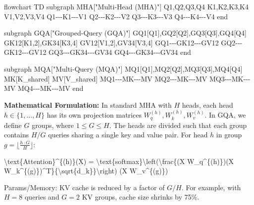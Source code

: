 \documentclass[
]{article}
\newenvironment{Shaded}{}{}
\newcommand{\NormalTok}[1]{#1}
\begin{document}
\begin{Shaded}
\begin{Highlighting}[]
\NormalTok{flowchart TD}
\NormalTok{    subgraph MHA["Multi{-}Head (MHA)"]}
\NormalTok{        Q1,Q2,Q3,Q4}
\NormalTok{        K1,K2,K3,K4}
\NormalTok{        V1,V2,V3,V4}
\NormalTok{        Q1{-}{-}{-}K1{-}{-}{-}V1}
\NormalTok{        Q2{-}{-}{-}K2{-}{-}{-}V2}
\NormalTok{        Q3{-}{-}{-}K3{-}{-}{-}V3}
\NormalTok{        Q4{-}{-}{-}K4{-}{-}{-}V4}
\NormalTok{    end}
    
\NormalTok{    subgraph GQA["Grouped{-}Query (GQA)"]}
\NormalTok{        GQ1[Q1],GQ2[Q2],GQ3[Q3],GQ4[Q4]}
\NormalTok{        GK12[K1,2],GK34[K3,4]}
\NormalTok{        GV12[V1,2],GV34[V3,4]}
\NormalTok{        GQ1{-}{-}{-}GK12{-}{-}{-}GV12}
\NormalTok{        GQ2{-}{-}{-}GK12{-}{-}{-}GV12}
\NormalTok{        GQ3{-}{-}{-}GK34{-}{-}{-}GV34}
\NormalTok{        GQ4{-}{-}{-}GK34{-}{-}{-}GV34}
\NormalTok{    end}
    
\NormalTok{    subgraph MQA["Multi{-}Query (MQA)"]}
\NormalTok{        MQ1[Q1],MQ2[Q2],MQ3[Q3],MQ4[Q4]}
\NormalTok{        MK[K\_shared]}
\NormalTok{        MV[V\_shared]}
\NormalTok{        MQ1{-}{-}{-}MK{-}{-}{-}MV}
\NormalTok{        MQ2{-}{-}{-}MK{-}{-}{-}MV}
\NormalTok{        MQ3{-}{-}{-}MK{-}{-}{-}MV}
\NormalTok{        MQ4{-}{-}{-}MK{-}{-}{-}MV}
\NormalTok{    end}
\end{Highlighting}
\end{Shaded}

\textbf{Mathematical Formulation:} In standard MHA with \(H\) heads,
each head \(h \in \{1, \dots, H\}\) has its own projection matrices
\(W_q^{(h)}, W_k^{(h)}, W_v^{(h)}\). In GQA, we define \(G\) groups,
where \(1 \le G \le H\). The heads are divided such that each group
contains \(H / G\) queries sharing a single key and value pair. For head
\(h\) in group \(g = \lfloor \frac{h \cdot G}{H} \rfloor\):

\begin{Shaded}
\begin{Highlighting}[]
\NormalTok{\textbackslash{}text\{Attention\}\^{}\{(h)\}(X) = \textbackslash{}text\{softmax\}\textbackslash{}left(\textbackslash{}frac\{(X W\_q\^{}\{(h)\})(X W\_k\^{}\{(g)\})\^{}T\}\{\textbackslash{}sqrt\{d\_k\}\}\textbackslash{}right) (X W\_v\^{}\{(g)\})}
\end{Highlighting}
\end{Shaded}

Params/Memory: KV cache is reduced by a factor of \(G/H\). For example,
with \(H=8\) queries and \(G=2\) KV groups, cache size shrinks by 75\%.
\end{document}
